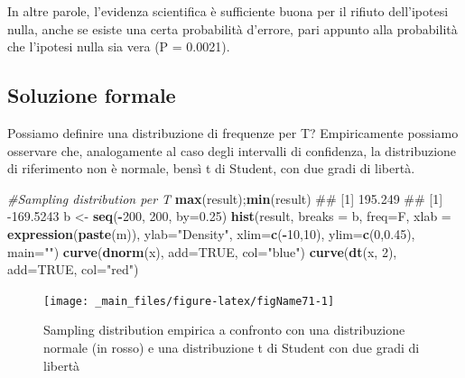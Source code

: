 \documentclass[a4paper,12pt,oneside]{book}
\newenvironment{Shaded}{\begin{snugshade}}{\end{snugshade}}
\newcommand{\KeywordTok}[1]{\textcolor[rgb]{0.13,0.29,0.53}{\textbf{#1}}}
\newcommand{\DataTypeTok}[1]{\textcolor[rgb]{0.13,0.29,0.53}{#1}}
\newcommand{\DecValTok}[1]{\textcolor[rgb]{0.00,0.00,0.81}{#1}}
\newcommand{\FloatTok}[1]{\textcolor[rgb]{0.00,0.00,0.81}{#1}}
\newcommand{\StringTok}[1]{\textcolor[rgb]{0.31,0.60,0.02}{#1}}
\newcommand{\CommentTok}[1]{\textcolor[rgb]{0.56,0.35,0.01}{\textit{#1}}}
\newcommand{\OtherTok}[1]{\textcolor[rgb]{0.56,0.35,0.01}{#1}}
\newcommand{\OperatorTok}[1]{\textcolor[rgb]{0.81,0.36,0.00}{\textbf{#1}}}
\newcommand{\NormalTok}[1]{#1}
\theoremstyle{definition}
\theoremstyle{definition}
\theoremstyle{definition}
\theoremstyle{remark}
\begin{document}
In altre parole, l'evidenza scientifica è sufficiente buona per il
rifiuto dell'ipotesi nulla, anche se esiste una certa probabilità
d'errore, pari appunto alla probabilità che l'ipotesi nulla sia vera (P
= 0.0021).

\subsection{Soluzione formale}\label{soluzione-formale}

Possiamo definire una distribuzione di frequenze per T? Empiricamente
possiamo osservare che, analogamente al caso degli intervalli di
confidenza, la distribuzione di riferimento non è normale, bensì t di
Student, con due gradi di libertà.

\begin{Shaded}
\begin{Highlighting}[]
\CommentTok{#Sampling distribution per T }
\KeywordTok{max}\NormalTok{(result);}\KeywordTok{min}\NormalTok{(result)}
\NormalTok{## [1] 195.249}
\NormalTok{## [1] -169.5243}
\NormalTok{b <-}\StringTok{ }\KeywordTok{seq}\NormalTok{(}\OperatorTok{-}\DecValTok{200}\NormalTok{, }\DecValTok{200}\NormalTok{, }\DataTypeTok{by=}\FloatTok{0.25}\NormalTok{)}
\KeywordTok{hist}\NormalTok{(result, }\DataTypeTok{breaks =}\NormalTok{ b, }\DataTypeTok{freq=}\NormalTok{F, }
  \DataTypeTok{xlab =} \KeywordTok{expression}\NormalTok{(}\KeywordTok{paste}\NormalTok{(m)), }\DataTypeTok{ylab=}\StringTok{"Density"}\NormalTok{, }
  \DataTypeTok{xlim=}\KeywordTok{c}\NormalTok{(}\OperatorTok{-}\DecValTok{10}\NormalTok{,}\DecValTok{10}\NormalTok{), }\DataTypeTok{ylim=}\KeywordTok{c}\NormalTok{(}\DecValTok{0}\NormalTok{,}\FloatTok{0.45}\NormalTok{), }\DataTypeTok{main=}\StringTok{""}\NormalTok{)}
\KeywordTok{curve}\NormalTok{(}\KeywordTok{dnorm}\NormalTok{(x), }\DataTypeTok{add=}\OtherTok{TRUE}\NormalTok{, }\DataTypeTok{col=}\StringTok{"blue"}\NormalTok{)}
\KeywordTok{curve}\NormalTok{(}\KeywordTok{dt}\NormalTok{(x, }\DecValTok{2}\NormalTok{), }\DataTypeTok{add=}\OtherTok{TRUE}\NormalTok{, }\DataTypeTok{col=}\StringTok{"red"}\NormalTok{)}
\end{Highlighting}
\end{Shaded}

\begin{figure}

{\centering \texttt{[image: \_main\_files/figure-latex/figName71-1]} 

}

\caption{Sampling distribution empirica a confronto con una distribuzione normale (in rosso) e una distribuzione t di Student con due gradi di libertà}\label{fig:figName71}
\end{figure}
\end{document}

